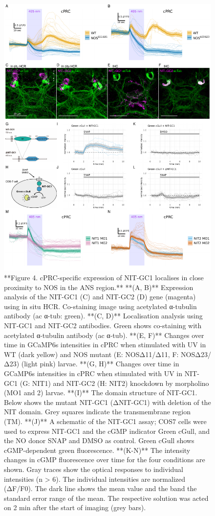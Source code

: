 \documentclass[
  10pt,
  onecolumn]{article}
\begin{document}
\begin{figure}
\includegraphics[width=38.89in]{figures/Fig4} \caption{**Figure 4. cPRC-specific expression of NIT-GC1 localises in close proximity to NOS in the ANS region.** **(A, B)** Expression analysis of the NIT-GC1 (C) and NIT-GC2 (D) gene (magenta) using in situ HCR. Co-staining image using acetylated α-tubulin antibody (ac α-tub: green). **(C, D)** Localisation analysis using NIT-GC1 and NIT-GC2 antibodies. Green shows co-staining with acetylated α-tubulin antibody (ac α-tub). **(E, F)** Changes over time in GCaMP6s intensities in cPRC when stimulated with UV in WT (dark yellow) and NOS mutant (E: NOSΔ11/Δ11, F: NOSΔ23/Δ23) (light pink) larvae. **(G, H)** Changes over time in GCaMP6s intensities in cPRC when stimulated with UV in NIT-GC1 (G: NIT1) and NIT-GC2 (H: NIT2) knockdown by morpholino (MO1 and 2) larvae. **(I)** The domain structure of NIT-GC1. Below shows the mutant NIT-GC1 (ΔNIT-GC1) with deletion of the NIT domain. Grey squares indicate the transmembrane region (TM). **(J)** A schematic of the NIT-GC1 assay; COS7 cells were used to express NIT-GC1 and the cGMP indicator Green cGull, and the NO donor SNAP and DMSO as control. Green cGull shows cGMP-dependent green fluorescence. **(K-N)** The intensity changes in cGMP fluorescence over time for the four conditions are shown. Gray traces show the optical responses to individual intensities (n > 6). The individual intensities are normalized (ΔF/F0). The dark line shows the mean value and the band the standard error range of the mean. The respective solution was acted on 2 min after the start of imaging (grey bars).}\label{fig:unnamed-chunk-4}
\end{figure}
\end{document}
